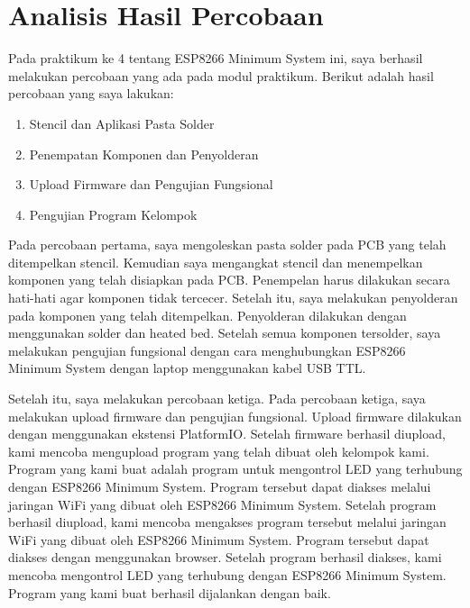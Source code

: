 \section*{Analisis Hasil Percobaan}
\indent
Pada praktikum ke 4 tentang ESP8266 Minimum System ini, saya berhasil melakukan percobaan yang ada pada modul praktikum. Berikut adalah hasil percobaan yang saya lakukan:

\begin{enumerate}
    \item Stencil dan Aplikasi Pasta Solder
    \item Penempatan Komponen dan Penyolderan
    \item Upload Firmware dan Pengujian Fungsional
    \item Pengujian Program Kelompok
\end{enumerate}

\indent
Pada percobaan pertama, saya mengoleskan pasta solder pada PCB yang telah ditempelkan stencil. Kemudian saya mengangkat stencil dan menempelkan komponen yang telah disiapkan pada PCB. Penempelan harus dilakukan secara hati-hati agar komponen tidak tercecer. Setelah itu, saya melakukan penyolderan pada komponen yang telah ditempelkan. Penyolderan dilakukan dengan menggunakan solder dan heated bed. Setelah semua komponen tersolder, saya melakukan pengujian fungsional dengan cara menghubungkan ESP8266 Minimum System dengan laptop menggunakan kabel USB TTL.

\indent
Setelah itu, saya melakukan percobaan ketiga. Pada percobaan ketiga, saya melakukan upload firmware dan pengujian fungsional. Upload firmware dilakukan dengan menggunakan ekstensi PlatformIO. Setelah firmware berhasil diupload, kami mencoba mengupload program yang telah dibuat oleh kelompok kami. Program yang kami buat adalah program untuk mengontrol LED yang terhubung dengan ESP8266 Minimum System. Program tersebut dapat diakses melalui jaringan WiFi yang dibuat oleh ESP8266 Minimum System. Setelah program berhasil diupload, kami mencoba mengakses program tersebut melalui jaringan WiFi yang dibuat oleh ESP8266 Minimum System. Program tersebut dapat diakses dengan menggunakan browser. Setelah program berhasil diakses, kami mencoba mengontrol LED yang terhubung dengan ESP8266 Minimum System. Program yang kami buat berhasil dijalankan dengan baik.
